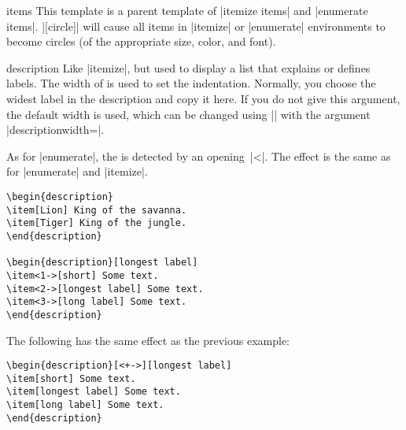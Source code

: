 \begin{element}{items}\semiyes\no\no
  This template is a parent template of |itemize items| and
  |enumerate items|.
  \example |[circle]| will cause all items in
  |itemize| or |enumerate| environments to become circles (of the
  appropriate size, color, and font).
\end{element}


\label{section-descriptions}
  
\begin{environment}{{description}} 
  Like |itemize|, but used to display a list that explains or defines
  labels. The width of  is used to set the
  indentation. Normally, you choose the widest label in the
  description and copy it here. If you do not give this argument, the
  default width is used, which can be changed using |\setbeamermargin|
  with the argument |descriptionwidth=|.

  As for |enumerate|, the  is
  detected by an opening~|<|. The effect is the same as for
  |enumerate| and |itemize|.
  \example
\begin{verbatim}
\begin{description}
\item[Lion] King of the savanna.
\item[Tiger] King of the jungle.
\end{description}

\begin{description}[longest label]
\item<1->[short] Some text.
\item<2->[longest label] Some text.
\item<3->[long label] Some text.
\end{description}
\end{verbatim}

  \example The following has the same effect as the previous example:
\begin{verbatim}
\begin{description}[<+->][longest label]
\item[short] Some text.
\item[longest label] Some text.
\item[long label] Some text.
\end{description}
\end{verbatim}


\end{environment}
